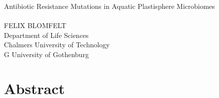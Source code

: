 Antibiotic Resistance Mutations in Aquatic Plastisphere Microbiomes\\
\\
FELIX BLOMFELT\\
Department of Life Sciences\\
Chalmers University of Technology\\
\if\InstitutionLocation G
University of Gothenburg\\
\fi
\setlength{\parskip}{0.5cm}

\thispagestyle{plain}			%
\setlength{\parskip}{0pt plus 1.0pt}
\section*{Abstract}

